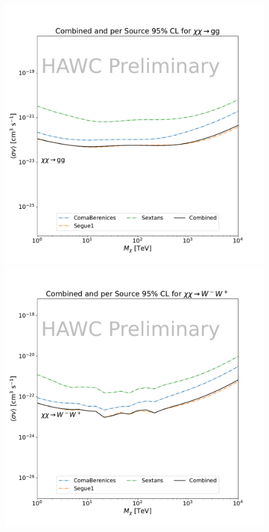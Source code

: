\begin{figure}[h]
{    \includegraphics[scale=0.21]{figures/mtd_hawc_dm/results/Combined95_New_duck_gg_.pdf}
    \includegraphics[scale=0.21]{figures/mtd_hawc_dm/results/Combined95_New_duck_ww_.pdf}
}
\end{figure}
